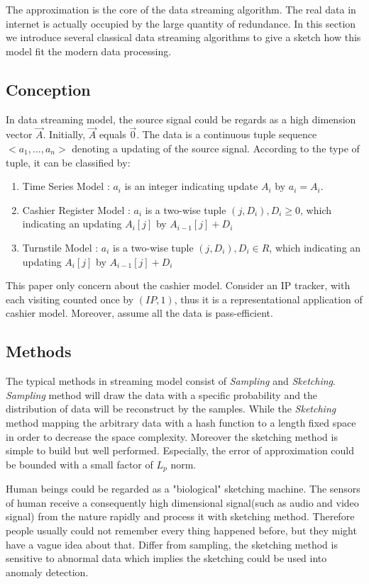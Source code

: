 \documentclass{article} %
\begin{document}
The approximation is the core of the data streaming algorithm. The real data in internet is actually occupied by the large quantity of redundance. In this section we introduce several classical data streaming algorithms to give a sketch how this model fit the modern data processing.

\subsection{Conception}
In data streaming model, the source signal could be regards as a high dimension vector $\vec{A}$. Initially, $\vec{A}$ equals $\vec{0}$.  The data is a continuous tuple sequence $<a_1, ..., a_n>$ denoting a updating of the source signal. According to the type of tuple, it can be classified by:
\begin{enumerate}
\item Time Series Model : $a_i$ is an integer indicating update $A_i$ by $a_i = A_i$.
\item Cashier Register Model : $a_i$ is a two-wise tuple $(j, D_i), D_i \ge 0$, which indicating an updating $A_i[j]$ by $A_{i-1}[j] + D_i$
\item Turnstile Model : $a_i$ is a two-wise tuple $(j, D_i), D_i \in R$, which indicating an updating $A_i[j]$ by $A_{i-1}[j] + D_i$
\end{enumerate}
This paper only concern about the cashier model. Consider an IP tracker, with each visiting counted once by $(IP, 1)$, thus it is a representational application of cashier model. Moreover, assume all the data is pass-efficient.

\subsection{Methods}
The typical methods in streaming model consist of \emph{Sampling} and \emph{Sketching}. \emph{Sampling} method will draw the data with a specific probability and the distribution of data will be reconstruct by the samples. While the \emph{Sketching} method mapping the arbitrary data with a hash function to a length fixed space in order to decrease the space complexity. Moreover the sketching method is simple to build but well performed. Especially, the error of approximation could be bounded with a small factor of $L_p$ norm.

Human beings could be regarded as a "biological" sketching machine. The sensors of human receive a consequently high dimensional signal(such as audio and video signal) from the nature rapidly and process it with sketching method. Therefore people usually could not remember every thing happened before, but they might have a vague idea about that. Differ from sampling, the sketching method is sensitive to abnormal data which implies the sketching could be used into anomaly detection.
\end{document}
